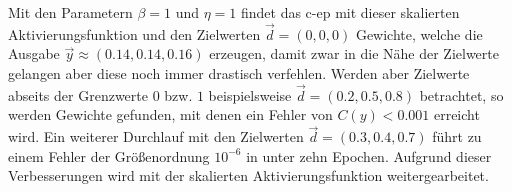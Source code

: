 Mit den Parametern \(\beta=1\) und \(\eta=1\) findet das \ac{c-ep} mit dieser skalierten Aktivierungsfunktion und den Zielwerten \(\vec{d}=(0,0,0)\) Gewichte, welche die Ausgabe \(\vec{y}\approx(0.14,0.14,0.16)\) erzeugen, damit zwar in die Nähe der Zielwerte gelangen aber diese noch immer drastisch verfehlen. Werden aber Zielwerte abseits der Grenzwerte \(0\) bzw. \(1\) beispielsweise \(\vec{d}=(0.2,0.5,0.8)\) betrachtet, so werden Gewichte gefunden, mit denen ein Fehler von \(C(y)<0.001\) erreicht wird. Ein weiterer Durchlauf mit den Zielwerten \(\vec{d}=(0.3,0.4,0.7)\) führt zu einem Fehler der Größenordnung \(10^{-6}\) in unter zehn Epochen. Aufgrund dieser Verbesserungen wird mit der skalierten Aktivierungsfunktion weitergearbeitet.
